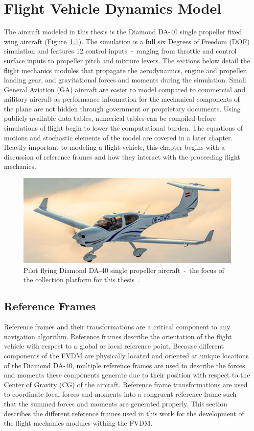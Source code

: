 \chapter{Flight Vehicle Dynamics Model}
The aircraft modeled in this thesis is the Diamond DA-40 single propeller fixed wing aircraft (Figure~\ref{fig:DA40}). The simulation is a full six Degrees of Freedom (DOF) simulation and features 12 control inputs~-~ranging from throttle and control surface inputs to propeller pitch and mixture levers. The sections below detail the flight mechanics modules that propagate the aerodynamics, engine and propeller, landing gear, and gravitational forces and moments during the simulation. Small General Aviation (GA) aircraft are easier to model compared to commercial and military aircraft as performance information for the mechanical components of the plane are not hidden through government or proprietary documents. Using publicly available data tables, numerical tables can be compiled before simulations of flight begin to lower the computational burden. The equations of motions and stochastic elements of the model are covered in a later chapter. Heavily important to modeling a flight vehicle, this chapter begins with a discussion of reference frames and how they interact with the proceeding flight mechanics.

\begin{figure}[!ht]\label{fig:DA40}
    \centering
    \includegraphics[width=.85\linewidth]{Figures/DA40.jpg}
    \caption{Pilot flying Diamond DA-40 single propeller aircraft~-~the focus of the collection platform for this thesis~\cite{DiamondAircraftDA401969}.}
\end{figure}

\section{\textbf{Reference Frames}}
Reference frames and their transformations are a critical component to any navigation algorithm. Reference frames describe the orientation of the flight vehicle with respect to a global or local reference point. Because different components of the FVDM are physically located and oriented at unique locations of the Diamond DA-40, multiple reference frames are used to describe the forces and moments these components generate due to their position with respect to the Center of Gravity (CG) of the aircraft. Reference frame transformations are used to coordinate local forces and moments into a congruent reference frame such that the summed forces and moments are generated properly. This section describes the different reference frames used in this work for the development of the flight mechanics modules withing the FVDM\@.
